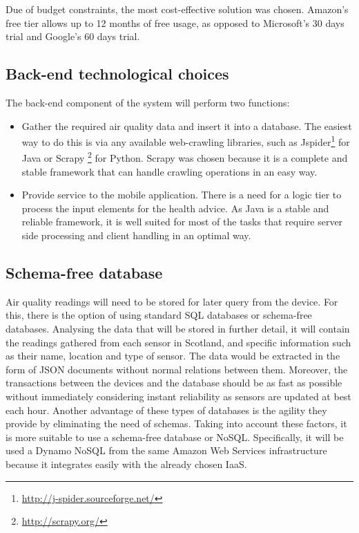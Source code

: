 Due of budget constraints, the most cost-effective solution was chosen. Amazon's free tier allows up to 12 months of free usage, as opposed to Microsoft's 30 days trial and Google's 60 days trial.

\subsection{Back-end technological choices}
The back-end component of the system will perform two functions: 

\begin{itemize}
	\item Gather the required air quality data and insert it into a database. The easiest way to do this is via any available web-crawling libraries, such as Jspider\footnote{\url{http://j-spider.sourceforge.net/}} for Java or Scrapy \footnote{\url{http://scrapy.org/}} for Python. Scrapy was chosen because it is a complete and stable framework that can handle crawling operations in an easy way. 
	\item Provide service to the mobile application. There is a need for a logic tier to process the input elements for the health advice. As Java is a stable and reliable framework,  it is well suited for most of the tasks that require server side processing and client handling in an optimal way.
\end{itemize}

\subsection{Schema-free database}

Air quality readings will need to be stored for later query from the device. For this, there is the option of using standard SQL databases or schema-free databases. Analysing the data that will be stored in further detail, it will contain the readings gathered from each sensor in Scotland, and specific information such as their name, location and type of sensor. The data would be extracted in the form of JSON documents without normal relations between them. Moreover, the transactions between the devices and the database should be as fast as possible without immediately considering instant reliability as sensors are updated at best each hour. Another advantage of these types of databases is the agility they provide by eliminating the need of schemas. Taking into account these factors, it is more suitable to use a schema-free database or NoSQL. Specifically, it will be used a Dynamo NoSQL from the same Amazon Web Services infrastructure because it integrates easily with the already chosen IaaS.

